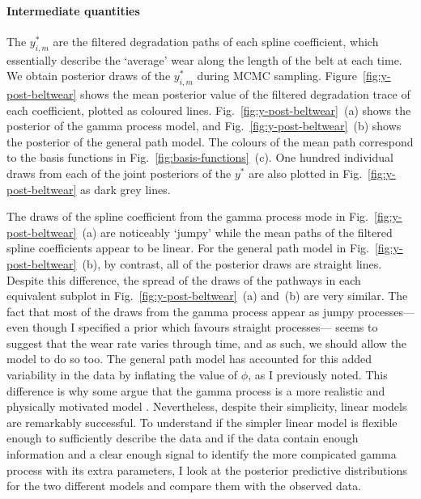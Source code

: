 \paragraph{Intermediate quantities}
The $y^*_{i, m}$ are the filtered degradation paths of each spline coefficient, which essentially describe the `average' wear along the length of the belt at each time. We obtain posterior draws of the $y^*_{i, m}$ during MCMC sampling. Figure~\ref{fig:y-post-beltwear} shows the mean posterior value of the filtered degradation trace of each coefficient, plotted as coloured lines. Fig.~\ref{fig:y-post-beltwear}~(a) shows the posterior of the gamma process model, and Fig.~\ref{fig:y-post-beltwear}~(b) shows the posterior of the general path model. The colours of the mean path correspond to the basis functions in Fig.~\ref{fig:basis-functions}~(c). One hundred individual draws from each of the joint posteriors of the $y^*$ are also plotted in Fig.~\ref{fig:y-post-beltwear} as dark grey lines.

The draws of the spline coefficient from the gamma process mode in Fig.~\ref{fig:y-post-beltwear}~(a) are noticeably `jumpy' while the mean paths of the filtered spline coefficients appear to be linear. For the general path model in Fig.~\ref{fig:y-post-beltwear}~(b), by contrast, all of the posterior draws are straight lines. Despite this difference, the spread of the draws of the pathways in each equivalent subplot in Fig.~\ref{fig:y-post-beltwear}~(a) and~(b) are very similar. The fact that most of the draws from the gamma process appear as jumpy processes---even though I specified a prior which favours straight processes--- seems to suggest that the wear rate varies through time, and as such, we should allow the model to do so too. The general path model has accounted for this added variability in the data by inflating the value of $\phi$, as I previously noted. This difference is why some argue that the gamma process is a more realistic and physically motivated model \citep{ye2015}. Nevertheless, despite their simplicity, linear models are remarkably successful. To understand if the simpler linear model is flexible enough to sufficiently describe the data and if the data contain enough information and a clear enough signal to identify the more compicated gamma process with its extra parameters, I look at the posterior predictive distributions for the two different models and compare them with the observed data.

